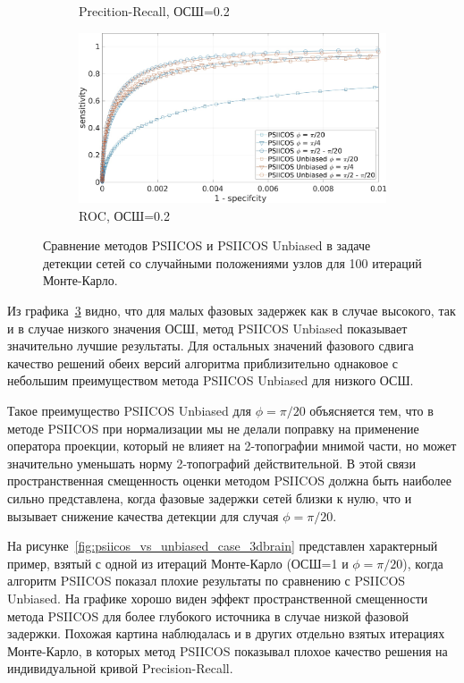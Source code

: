 \begin{figure}[htbp]
\begin{subfigure}[t]{0.5\textwidth}
        \caption{Precition-Recall, ОСШ=0.2}\label{fig:psiicos_vs_unbiased_monte_c}
    \end{subfigure}
    \begin{subfigure}[t]{0.5\textwidth}
        \includegraphics[width=0.99\linewidth]{../images/roc_snr_02.jpg}
        \caption{ROC, ОСШ=0.2}\label{fig:psiicos_vs_unbiased_monte_d}
    \end{subfigure}
    \caption{Сравнение методов PSIICOS и PSIICOS Unbiased в задаче детекции сетей со случайными
    положениями узлов для 100 итераций Монте-Карло.}\label{fig:psiicos_vs_unbiased_monte}
\end{figure}

Из графика~\ref{fig:psiicos_vs_unbiased_monte} видно, что для малых фазовых задержек
как в случае высокого, так и в случае низкого значения ОСШ, метод PSIICOS Unbiased
показывает значительно лучшие результаты. Для остальных значений фазового сдвига
качество решений обеих версий алгоритма приблизительно однаковое с небольшим
преимуществом метода PSIICOS Unbiased для низкого ОСШ.

Такое преимущество PSIICOS Unbiased для $\phi=\pi/20$ объясняется тем, что в методе
PSIICOS при нормализации мы не делали поправку на применение оператора проекции, который
не влияет на 2-топографии мнимой части, но может значительно уменьшать норму 2-топографий
действительной. В этой связи пространственная смещенность оценки методом PSIICOS должна
быть наиболее сильно представлена, когда фазовые задержки сетей близки к нулю, что и вызывает
снижение качества детекции для случая $\phi=\pi/20$.

На рисунке~\ref{fig:psiicos_vs_unbiased_case_3dbrain} представлен характерный пример, взятый с одной из итераций Монте-Карло (ОСШ=1 и $\phi=\pi/20$),
когда алгоритм PSIICOS показал плохие результаты
по сравнению с PSIICOS Unbiased. На графике хорошо виден эффект пространственной смещенности
метода PSIICOS для более глубокого источника в случае низкой фазовой задержки.
Похожая картина наблюдалась и в других отдельно взятых итерациях Монте-Карло, в которых
метод PSIICOS показывал плохое качество решения на индивидуальной кривой Precision-Recall.

